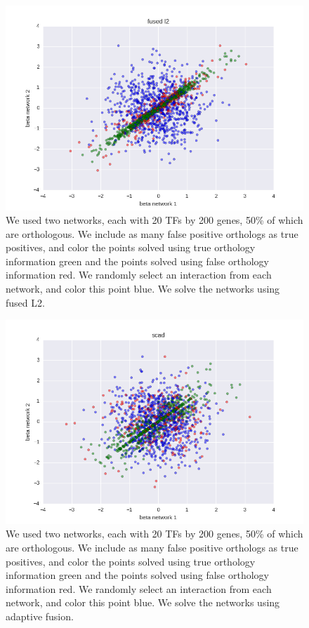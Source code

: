 \documentclass[11pt]{article}
\begin{document}
\begin{figure}
\begin{center}
  \includegraphics[scale=0.45]{plot_betas_scad_l2.png}
  \caption{\label{fig:figure1} We used two networks, each with 20 TFs by 200 genes, 50\% of which are orthologous. We include as many false positive orthologs as true positives, and color the points solved using true orthology information green and the points solved using false orthology information red. We randomly select an interaction from each network, and color this point blue. We solve the networks using fused L2.}
  \end{center}
\end{figure}

\begin{figure}
\begin{center}
  \includegraphics[scale=0.45]{plot_betas_scad.png}
  \caption{\label{fig:figure1} We used two networks, each with 20 TFs by 200 genes, 50\% of which are orthologous. We include as many false positive orthologs as true positives, and color the points solved using true orthology information green and the points solved using false orthology information red. We randomly select an interaction from each network, and color this point blue. We solve the networks using adaptive fusion.}
  \end{center}
\end{figure}
\end{document}
